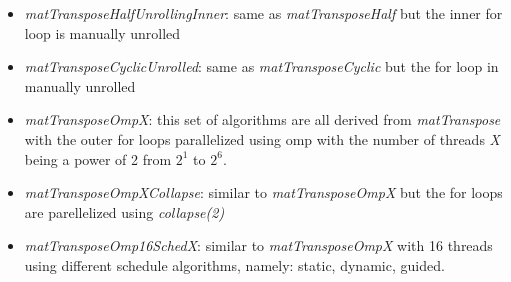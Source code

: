 \documentclass[conference]{IEEEtran}
\begin{document}
\begin{itemize}
\item \textit{matTransposeHalfUnrollingInner}: same as \textit{matTransposeHalf} but the inner for loop is manually unrolled
\fi

\item \textit{matTransposeCyclicUnrolled}: same as \textit{matTransposeCyclic} but the for loop in manually unrolled

\item \textit{matTransposeOmpX}: this set of algorithms are all derived from \textit{matTranspose} with the outer for loops parallelized using omp with the number of threads \textit{X} being a power of 2 from $2^1$ to $2^6$.

\item \textit{matTransposeOmpXCollapse}: similar to \textit{matTransposeOmpX} but the for loops are parellelized using \textit{collapse(2)}
  
\item \textit{matTransposeOmp16SchedX}: similar to \textit{matTransposeOmpX} with 16 threads using different schedule algorithms, namely: static, dynamic, guided.
\end{itemize}
\end{document}
